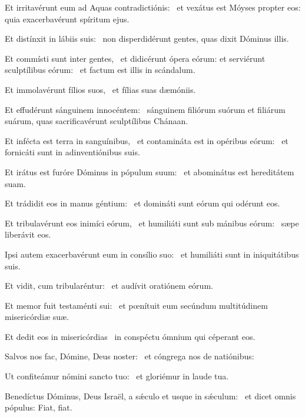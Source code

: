 \item Et irritavérunt eum ad Aquas contradictiónis:~\psstar{} et vexátus est Móyses propter eos: quia exacerbavérunt spíritum ejus.

\item Et distínxit in lábiis suis:~\psstar{} non disperdidérunt gentes, quas dixit Dóminus illis.

\item Et commísti sunt inter gentes,~\pscross{} et didicérunt ópera eórum: et serviérunt sculptílibus eórum:~\psstar{} et factum est illis in scándalum.

\item Et immolavérunt fílios suos,~\psstar{} et fílias suas dæmóniis.

\item Et effudérunt sánguinem innocéntem:~\psstar{} sánguinem filiórum suórum et filiárum suárum, quas sacrificavérunt sculptílibus Chánaan.

\item Et infécta est terra in sanguínibus,~\pscross{} et contamináta est in opéribus eórum:~\psstar{} et fornicáti sunt in adinventiónibus suis.

\item Et irátus est furóre Dóminus in pópulum suum:~\psstar{} et abominátus est hereditátem suam.

\item Et trádidit eos in manus géntium:~\psstar{} et domináti sunt eórum qui odérunt eos.

\item Et tribulavérunt eos inimíci eórum,~\pscross{} et humiliáti sunt sub mánibus eórum:~\psstar{} sæpe liberávit eos.

\item Ipsi autem exacerbavérunt eum in consílio suo:~\psstar{} et humiliáti sunt in iniquitátibus suis.

\item Et vidit, cum tribularéntur:~\psstar{} et audívit oratiónem eórum.

\item Et memor fuit testaménti sui:~\psstar{} et pœnítuit eum secúndum multitúdinem misericórdiæ suæ.

\item Et dedit eos in misericórdias~\psstar{} in conspéctu ómnium qui céperant eos.

\item Salvos nos fac, Dómine, Deus noster:~\psstar{} et cóngrega nos de natiónibus:

\item Ut confiteámur nómini sancto tuo:~\psstar{} et gloriémur in laude tua.

\item Benedíctus Dóminus, Deus Israël, a sǽculo et usque in sǽculum:~\psstar{} et dicet omnis pópulus: Fiat, fiat.